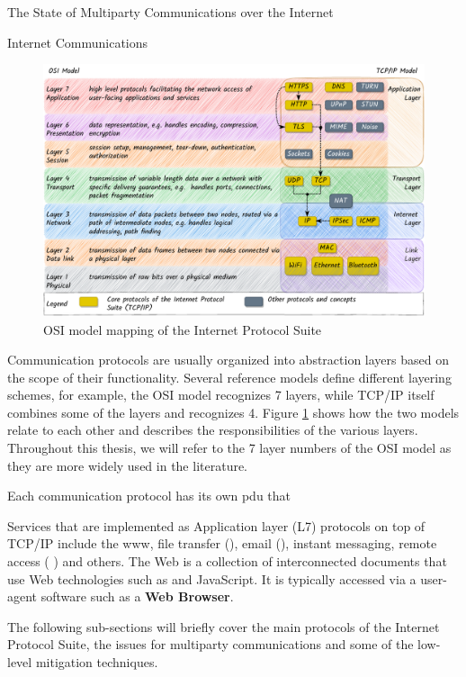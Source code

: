 \begin{frame}[fragile]{The State of Multiparty Communications over the
Internet}
\begin{block}{Internet Communications}
\begin{figure}
\centering
\includegraphics[width=1\textwidth,height=\textheight]{thesis/../figures/osi-map-tcp.drawio.pdf}
\caption{OSI model mapping of the Internet Protocol
Suite\label{osi-map-tcp}}
\end{figure}

Communication protocols are usually organized into abstraction layers
based on the scope of their functionality. Several reference models
define different layering schemes, for example, the OSI model recognizes
7 layers, while TCP/IP itself combines some of the layers and recognizes
4. Figure \ref{osi-map-tcp} shows how the two models relate to each
other and describes the responsibilities of the various layers.
Throughout this thesis, we will refer to the 7 layer numbers of the OSI
model as they are more widely used in the literature.

Each communication protocol has its own \gls{pdu} that

Services that are implemented as Application layer (L7) protocols on top
of TCP/IP include the \gls{www}, file transfer (), email
(), instant messaging, remote access (
\autocite{sshRFC}) and others. The Web is a collection of interconnected
documents that use Web technologies such as  and JavaScript. It
is typically accessed via a user-agent software such as a \textbf{Web
Browser}.

The following sub-sections will briefly cover the main protocols of the
Internet Protocol Suite, the issues for multiparty communications and
some of the low-level mitigation techniques.



\end{block}
\end{frame}

